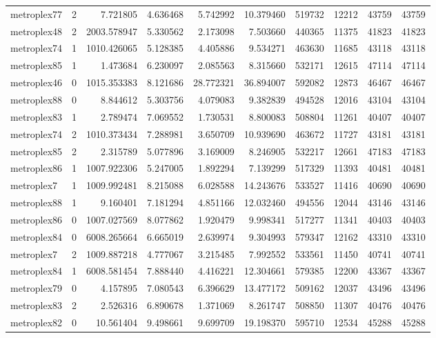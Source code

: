 \begin{longtable}{|l|r|r|r|r|r|r|r|r|r|}
metroplex77 & 2 & 7.721805 & 4.636468 & 5.742992 & 10.379460 & 519732 & 12212 & 43759 & 43759 \\
metroplex48 & 2 & 2003.578947 & 5.330562 & 2.173098 & 7.503660 & 440365 & 11375 & 41823 & 41823 \\
metroplex74 & 1 & 1010.426065 & 5.128385 & 4.405886 & 9.534271 & 463630 & 11685 & 43118 & 43118 \\
metroplex85 & 1 & 1.473684 & 6.230097 & 2.085563 & 8.315660 & 532171 & 12615 & 47114 & 47114 \\
metroplex46 & 0 & 1015.353383 & 8.121686 & 28.772321 & 36.894007 & 592082 & 12873 & 46467 & 46467 \\
metroplex88 & 0 & 8.844612 & 5.303756 & 4.079083 & 9.382839 & 494528 & 12016 & 43104 & 43104 \\
metroplex83 & 1 & 2.789474 & 7.069552 & 1.730531 & 8.800083 & 508804 & 11261 & 40407 & 40407 \\
metroplex74 & 2 & 1010.373434 & 7.288981 & 3.650709 & 10.939690 & 463672 & 11727 & 43181 & 43181 \\
metroplex85 & 2 & 2.315789 & 5.077896 & 3.169009 & 8.246905 & 532217 & 12661 & 47183 & 47183 \\
metroplex86 & 1 & 1007.922306 & 5.247005 & 1.892294 & 7.139299 & 517329 & 11393 & 40481 & 40481 \\
metroplex7 & 1 & 1009.992481 & 8.215088 & 6.028588 & 14.243676 & 533527 & 11416 & 40690 & 40690 \\
metroplex88 & 1 & 9.160401 & 7.181294 & 4.851166 & 12.032460 & 494556 & 12044 & 43146 & 43146 \\
metroplex86 & 0 & 1007.027569 & 8.077862 & 1.920479 & 9.998341 & 517277 & 11341 & 40403 & 40403 \\
metroplex84 & 0 & 6008.265664 & 6.665019 & 2.639974 & 9.304993 & 579347 & 12162 & 43310 & 43310 \\
metroplex7 & 2 & 1009.887218 & 4.777067 & 3.215485 & 7.992552 & 533561 & 11450 & 40741 & 40741 \\
metroplex84 & 1 & 6008.581454 & 7.888440 & 4.416221 & 12.304661 & 579385 & 12200 & 43367 & 43367 \\
metroplex79 & 0 & 4.157895 & 7.080543 & 6.396629 & 13.477172 & 509162 & 12037 & 43496 & 43496 \\
metroplex83 & 2 & 2.526316 & 6.890678 & 1.371069 & 8.261747 & 508850 & 11307 & 40476 & 40476 \\
metroplex82 & 0 & 10.561404 & 9.498661 & 9.699709 & 19.198370 & 595710 & 12534 & 45288 & 45288 \\

\end{longtable}
